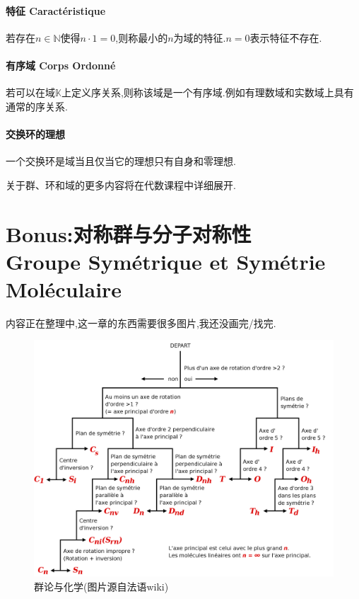 \documentclass[12pt, a4paper, oneside]{ctexbook}
\begin{document}
  \subsubsection{特征 Caractéristique}    \label{myref:特征}
  若存在$n\in \mathbb{N}$使得$n\cdot 1=0$,则称最小的$n$为域的特征.$n=0$表示特征不存在.
  \subsubsection{有序域 Corps Ordonné}
  若可以在域$\mathbb{K}$上定义序关系,则称该域是一个有序域.例如有理数域和实数域上具有通常的序关系.
  \subsubsection{交换环的理想}
  一个交换环是域当且仅当它的理想只有自身和零理想.



  关于群、环和域的更多内容将在代数课程中详细展开.





\chapter{\textbf{Bonus:}对称群与分子对称性\\ Groupe Symétrique et Symétrie Moléculaire}
  内容正在整理中,这一章的东西需要很多图片,我还没画完/找完.
  \begin{figure}[H]%
    \centering
    \includegraphics[scale=0.15]{groupe_chimie.png}
    \caption{群论与化学(图片源自法语wiki)}
    \label{myref:群与化学}
  \end{figure}
\end{document}
